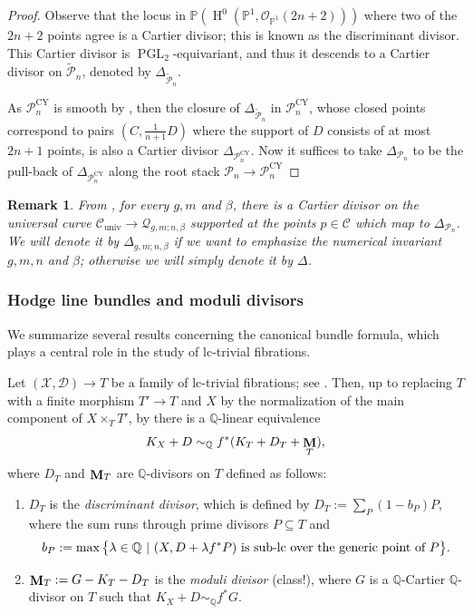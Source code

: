 \documentclass[a4paper,12pt]{amsart}
\newcommand{\wt}[1]{\widetilde{#1}}
\newcommand{\mts}[1]{\mathscr{#1}}
\newcommand{\cQ}{\mathcal{Q}}
\DeclareMathOperator{\PGL}{PGL}
\DeclareMathOperator{\univ}{univ}
\DeclareMathOperator{\CY}{CY}
\newcommand{\bQ}{{\mathbb Q}}
\newcommand{\bP}{{\mathbb P}}
\newcommand{\sU}{{\mathscr{U}}}
\newcommand{\sP}{{\mathscr{P}}}
\newcommand{\sC}{{\mathscr{C}}}
\newcommand{\cO}{{\mathcal{O}}}
\newcommand{\oH}{{\operatorname{H}}}
\DeclareMathOperator{\bfM}{{\bf{M}}}
\newtheorem{remark}[theorem]{Remark}
\theoremstyle{definition}
\theoremstyle{remark}
\begin{document}
\begin{proof}
    
    Observe that the locus in $\bP(\oH^0(\bP^1,\cO_{\bP^1}(2n+2)))$ where two of the $2n+2$ points agree is a Cartier divisor; this is known as the discriminant divisor. This Cartier divisor is $\PGL_2$-equivariant, and thus it descends to a Cartier divisor on $\wt{\sP}_n$, denoted by $\Delta_{\wt{\sP}_n}$.
    
   As $\sP_{n}^{\CY}$ is smooth by \cite[Lemma 16.8 (b)]{ABBDILW23}, then the closure of $\Delta_{\wt{\sP}_n}$ in $\sP_{n}^{\CY}$, whose closed points correspond to pairs $(C,\frac{1}{n+1}D)$ where the support of $D$ consists of at most $2n+1$ points, is also a Cartier divisor $\Delta_{\sP_{n}^{\CY}}$. Now it suffices to take $\Delta_{\sP_n}$ to be the pull-back of $\Delta_{\sP_{n}^{\CY}}$ along the root stack $\sP_n\rightarrow \sP_{n}^{\CY}$
\end{proof}

\begin{remark}\label{rem:existence of discriminant divisor}\textup{From , for every $g,m$ and $\beta$, there is a Cartier divisor on the universal curve $\sC_{\univ}\to \cQ_{g,m;n,\beta}$ supported at the points $p\in \sC$ which map to $\Delta_{\sP_n}$. We will denote it by $\Delta_{g,m;n,\beta}$ if we want to emphasize the numerical invariant $g,m,n$ and $\beta$; otherwise we will simply denote it by $\Delta$.}
\end{remark} 


\subsubsection{Hodge line bundles and moduli divisors}\label{subsubsection_moduli_part}
We summarize several results concerning the canonical bundle formula, which plays a central role in the study of lc-trivial fibrations.

Let $(\mts{X},\mts{D})\rightarrow T$ be a family of lc-trivial fibrations; see \cite[Definition 14.2]{ABBDILW23}. Then, up to replacing $T$ with a finite morphism $T'\to T$ and $X$ by the normalization of the main component of $X\times_T T'$, by \cite{Amb05} there is a $\bQ$-linear equivalence
$$K_X + D \sim_{\bQ} f^{*}(K_T + D_T +\bfM_T),$$
where $D_T$ and $\bfM_T$ are $\bQ$-divisors on $T$ defined as follows:
\begin{enumerate}
    \item $D_T$ is the \emph{discriminant divisor}, which is defined by $D_T := \sum_P (1-b_P )P$, where the sum runs through prime divisors $P \subseteq T$ and
$$b_P := \max\big\{\lambda \in \bQ \ |\  (X,D + \lambda f^*P)\textup{ is sub-lc over the generic point of }P\big\}.$$
    \item $\bfM_T := G -K_T - D_T$ is the \emph{moduli divisor} (class!), where $G$ is a $\bQ$-Cartier $\bQ$-divisor on $T$ such that $K_X + D\sim_{\bQ} f^{*}G$.
\end{enumerate}
\end{document}
